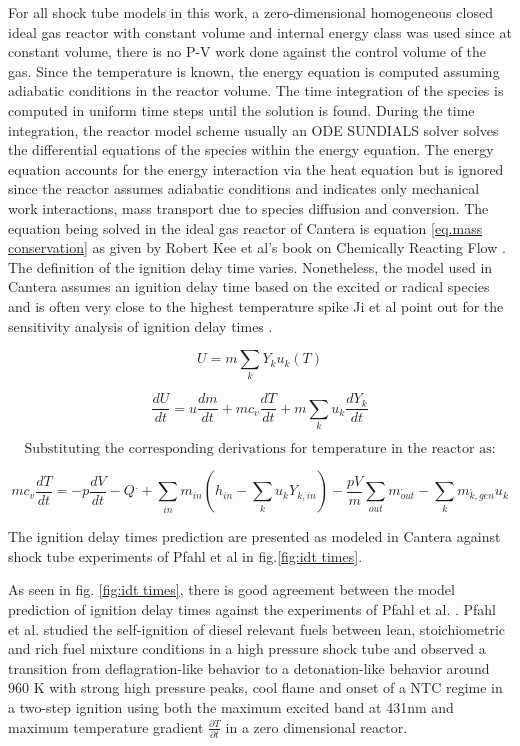 For all shock tube models in this work, a zero-dimensional homogeneous closed ideal gas reactor with constant volume and internal energy class was used since at constant volume, there is no P-V work done against the control volume of the gas. Since the temperature is known, the energy equation is computed assuming adiabatic conditions in the reactor volume. The time integration of the species is computed in uniform time steps until the solution is found. During the time integration, the reactor model scheme usually an ODE SUNDIALS solver \cite{hindmarsh2005sundials} solves the differential equations of the species within the energy equation. The energy equation accounts for the energy interaction via the heat equation but is ignored since the reactor assumes adiabatic conditions and indicates only mechanical work interactions, mass transport due to species diffusion and conversion.  The equation being solved in the ideal gas reactor  of Cantera is equation \ref{eq.mass conservation} as given by Robert Kee et al's book on Chemically Reacting Flow \cite{Kee2003ChemicallyPractice}. The definition of the ignition delay time varies. Nonetheless, the model used in Cantera assumes an ignition delay time based on the excited  or  radical species and is often very close to the highest temperature spike Ji et al point out for the sensitivity analysis of ignition delay times \cite{Ji2019EvolutionAutoignition}. 

\begin{equation}
    U = m\sum_k{Y_k u_k(T)}
\end{equation}

\begin{equation}
    \frac{dU}{dt} = u\frac{dm}{dt}+mc_v\frac{dT}{dt}+m\sum_k{u_k \frac{dY_k}{dt}}
\end{equation}

\[\text{Substituting the corresponding derivations for temperature in the reactor as:} \]


\begin{equation}
    mc_v\frac{dT}{dt}=-p\frac{dV}{dt} - Q^. + \sum_{in}{m_{in}(h_{in}- \sum_k{u_k Y_{k, in}}) -\frac{pV}{m}\sum_{out}{m_{out}^.} - \sum_k{m_{k, gen}^. u_k}}
    \label{eq.mass conservation}
\end{equation}

The ignition delay times prediction are presented as modeled in Cantera against shock tube experiments of Pfahl et al\cite{Pfahl1996Self-ignitionConditions} in fig.\ref{fig:idt times}.

As seen in fig. \ref{fig:idt times}, there is good agreement between the model prediction of ignition delay times against the experiments of Pfahl et al. \cite{Pfahl1996Self-ignitionConditions}. Pfahl et al. studied the self-ignition of diesel relevant fuels between lean, stoichiometric and rich fuel mixture conditions in a high pressure shock tube and observed a transition from deflagration-like behavior to a  detonation-like behavior around 960 K with strong high pressure peaks, cool flame and onset of a NTC regime in a two-step ignition using both the maximum  excited band at 431nm and maximum temperature gradient $\frac{\partial T}{\partial t}$ in a zero dimensional reactor.

